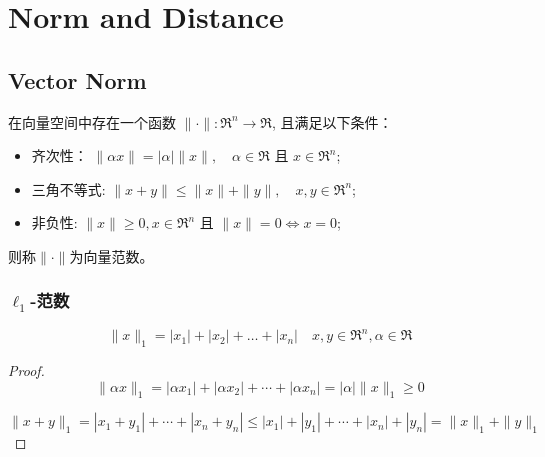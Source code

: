 \chapter{Norm and Distance}

\section{Vector Norm}

\begin{definition}
    在向量空间中存在一个函数 $ \|\cdot\|: \mathfrak{R}^{n} \rightarrow \mathfrak{R} $, 且满足以下条件：

\begin{itemize}
    \item 齐次性： $ \|\alpha x\|=|\alpha|\|x\|, \quad \alpha \in \mathfrak{R} $ 且 $ x \in \mathfrak{R}^{n} $;
    \item 三角不等式: $ \|x+y\| \leq\|x\|+\|y\|, \quad x, y \in \mathfrak{R}^{n} $;
    \item 非负性: $ \|x\| \geq {0}, {x} \in \mathfrak{R}^{n} $ 且 $ \|{x}\|=0 \Leftrightarrow {x}=0 $;
\end{itemize}
则称$\|\cdot\|$为向量范数。 
\end{definition}







\subsection{$ \ell_{1} $-范数}

\begin{example}
    \begin{equation} \|x\|_{1}=\left|x_{1}\right|+\left|x_{2}\right|+\ldots+\left|x_{n}\right| \quad x, y \in \mathfrak{R}^{n}, \alpha \in \mathfrak{R} \end{equation}
\end{example}

\begin{proof}
    \begin{equation} \|\alpha x\|_{1}=\left|\alpha x_{1}\right|+\left|\alpha x_{2}\right|+\cdots+\left|\alpha x_{n}\right|=|\alpha|\|x\|_{1} \geq 0 \end{equation}

    \begin{equation} \|x+y\|_{1}=\left|x_{1}+y_{1}\right|+\cdots+\left|x_{n}+y_{n}\right| \leq\left|x_{1}\right|+\left|y_{1}\right|+\cdots+\left|x_{n}\right|+\left|y_{n}\right|=\|x\|_{1}+\|y\|_{1} \end{equation}
\end{proof}

